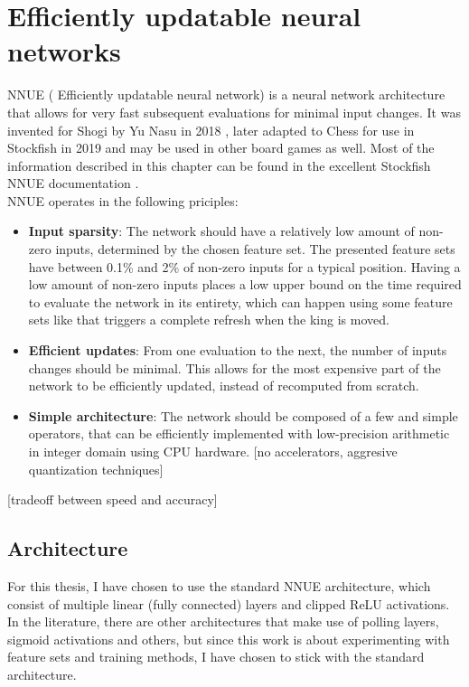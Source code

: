 \section{Efficiently updatable neural networks}

NNUE ( Efficiently updatable neural network) is a neural network architecture that allows for very fast subsequent evaluations for minimal input changes. It was invented for Shogi by Yu Nasu in 2018 \cite{nnue:2018}, later adapted to Chess for use in Stockfish in 2019 and may be used in other board games as well. Most of the information described in this chapter can be found in the excellent Stockfish NNUE documentation \cite{nnue-pytorch}. \\

NNUE operates in the following priciples:

\begin{itemize}
    \item \textbf{Input sparsity}: The network should have a relatively low amount of non-zero inputs, determined by the chosen feature set. The presented feature sets have between 0.1\% and 2\% of non-zero inputs for a typical position. Having a low amount of non-zero inputs places a low upper bound on the time required to evaluate the network in its entirety, which can happen using some feature sets like  that triggers a complete refresh when the king is moved.
    \item \textbf{Efficient updates}: From one evaluation to the next, the number of inputs changes should be minimal. This allows for the most expensive part of the network to be efficiently updated, instead of recomputed from scratch.
    \item \textbf{Simple architecture}: The network should be composed of a few and simple operators, that can be efficiently implemented with low-precision arithmetic in integer domain using CPU hardware. [no accelerators, aggresive quantization techniques]
\end{itemize}

[tradeoff between speed and accuracy]

\subsection{Architecture}

For this thesis, I have chosen to use the standard NNUE architecture, which consist of multiple linear (fully connected) layers and clipped ReLU activations. In the literature, there are other architectures that make use of polling layers, sigmoid activations and others, but since this work is about experimenting with feature sets and training methods, I have chosen to stick with the standard architecture.

